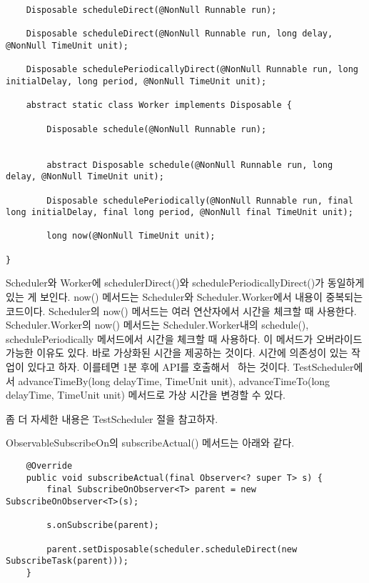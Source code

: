\documentclass{book}
\begin{document}
{\begin{verbatim}
    Disposable scheduleDirect(@NonNull Runnable run);
    
    Disposable scheduleDirect(@NonNull Runnable run, long delay, @NonNull TimeUnit unit);

    Disposable schedulePeriodicallyDirect(@NonNull Runnable run, long initialDelay, long period, @NonNull TimeUnit unit);
    
    abstract static class Worker implements Disposable {
        
        Disposable schedule(@NonNull Runnable run);

       
        abstract Disposable schedule(@NonNull Runnable run, long delay, @NonNull TimeUnit unit);

        Disposable schedulePeriodically(@NonNull Runnable run, final long initialDelay, final long period, @NonNull final TimeUnit unit);

        long now(@NonNull TimeUnit unit);

}
\end{verbatim}

Scheduler와 Worker에 schedulerDirect()와 schedulePeriodicallyDirect()가 동일하게 있는 게 보인다.
now() 메서드는 Scheduler와 Scheduler.Worker에서 내용이 중복되는 코드이다. 
Scheduler의 now() 메서드는 여러 연산자에서 시간을 체크할 때 사용한다.
Scheduler.Worker의 now() 메서드는 Scheduler.Worker내의 schedule(), schedulePeriodically 메서드에서 시간을 체크할 때 사용하다.
이 메서드가 오버라이드 가능한 이유도 있다. 바로 가상화된 시간을 제공하는 것이다.
시간에 의존성이 있는 작업이 있다고 하자. 이를테면 1분 후에 API를 호출해서 ~하는 것이다.
TestScheduler에서 advanceTimeBy(long delayTime, TimeUnit unit), advanceTimeTo(long delayTime, TimeUnit unit) 메서드로 가상 시간을 변경할 수 있다.

좀 더 자세한 내용은 TestScheduler 절을 참고하자.

ObservableSubscribeOn의 subscribeActual() 메서드는 아래와 같다.
\begin{verbatim}
    @Override
    public void subscribeActual(final Observer<? super T> s) {
        final SubscribeOnObserver<T> parent = new SubscribeOnObserver<T>(s);

        s.onSubscribe(parent);

        parent.setDisposable(scheduler.scheduleDirect(new SubscribeTask(parent)));
    }
\end{verbatim}

}
\end{document}
